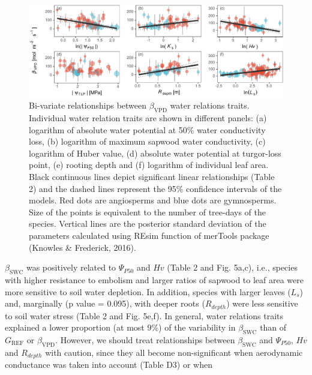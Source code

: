 \documentclass[11pt,twoside]{reedthesis}
\begin{document}
\begin{figure}[hbt!]

{\centering \includegraphics[width=1\linewidth]{figure/CH5/Figure_4} 

}

\caption[Bi-variate relationships between $\beta_{\text{VPD}}$ water relations traits.]{Bi-variate relationships between $\beta_{\text{VPD}}$ water relations traits. Individual water relation traits are shown in different panels: (a) logarithm of absolute water potential at 50\% water conductivity loss, (b) logarithm of maximum sapwood water conductivity, (c) logarithm of Huber value, (d) absolute water potential at turgor-loss point, (e) rooting depth and (f) logarithm of individual leaf area. Black continuous lines depict significant linear relationships (Table 2) and the dashed lines represent the 95\% confidence intervals of the models. Red dots are angiosperms and blue dots are gymnosperms. Size of the points is equivalent to the number of tree-days of the species. Vertical lines are the posterior standard deviation of the parameters calculated using REsim function of merTools package (Knowles \& Frederick, 2016).}\label{fig:ch5fig4}
\end{figure}
\(\beta_{\text{SWC}}\) was positively related to
\textbar{}\(\Psi_{P50}\)\textbar{} and \(Hv\) (Table 2 and Fig. 5a,c),
i.e., species with higher resistance to embolism and larger ratios of
sapwood to leaf area were more sensitive to soil water depletion. In
addition, species with larger leaves (\(L_s\)) and, marginally (p value
= 0.095), with deeper roots (\(R_{depth}\)) were less sensitive to soil
water stress (Table 2 and Fig. 5e,f). In general, water relations traits
explained a lower proportion (at most 9\%) of the variability in
\(\beta_{\text{SWC}}\) than of \(G_{\text{REF}}\) or
\(\beta_{\text{VPD}}\). However, we should treat relationships between
\(\beta_{\text{SWC}}\) and \textbar{}\(\Psi_{P50}\)\textbar{}, \(Hv\)
and \(R_{depth}\) with caution, since they all become non-significant
when aerodynamic conductance was taken into account (Table D3) or when
\end{document}
